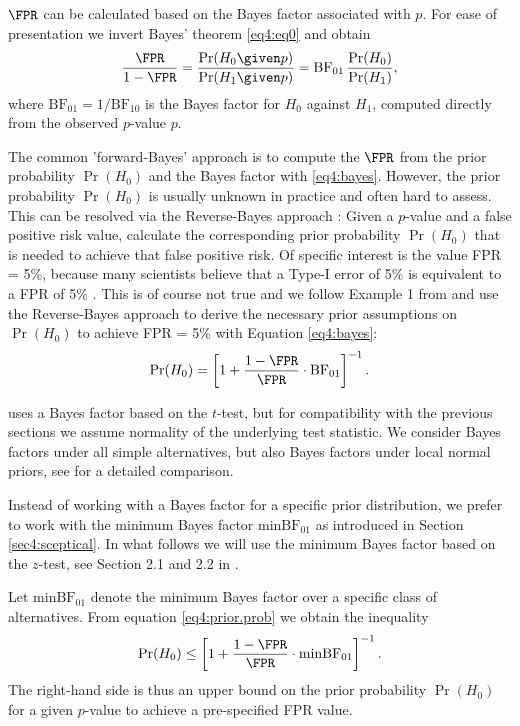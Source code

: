 $\FPR$ can be calculated based on the Bayes factor associated with $p$. For ease
of presentation we invert Bayes' theorem \eqref{eq4:eq0} and obtain
\begin{equation}\label{eq4:bayes}
      \frac{\FPR}{1-\FPR} = \frac{\Pr(H_0 \given p)}{\Pr(H_1 \given p)}
      = {\mbox{BF}_{01}} \, \frac{\Pr(H_0)}{\Pr(H_1)},
\end{equation}
where $\mbox{BF}_{01}=1/\mbox{BF}_{10}$ is the Bayes factor for $H_0$ against
$H_1$, computed directly from the observed $p$-value $p$.

The common 'forward-Bayes' approach is to compute the $\FPR$ from the prior
probability $\Pr(H_0)$ and the Bayes factor with \eqref{eq4:bayes}. However, the
prior probability $\Pr(H_0)$ is usually unknown in practice and often hard to
assess. This can be resolved via the Reverse-Bayes approach
\citep{Colquhoun2017,Colquhoun2019}: Given a $p$-value and a false positive risk
value, calculate the corresponding prior probability $\Pr(H_0)$ that is needed
to achieve that false positive risk. Of specific interest is the value FPR =
5\%, because many scientists believe that a Type-I error of 5\% is equivalent to
a FPR of 5\% \citep{Greenland2016}. This is of course not true and we follow
Example 1 from \citet{Berger1987} and use the Reverse-Bayes approach to derive
the necessary prior assumptions on $\Pr(H_0)$ to achieve FPR = 5\% with Equation
\eqref{eq4:bayes}:
\begin{equation}
  \label{eq4:prior.prob}
     \Pr(H_0) = \left[ 1 + \frac{1-\FPR}{\FPR} \cdot \mbox{BF}_{01}  \right]^{-1}.
\end{equation}

\citet{Colquhoun2017} uses a Bayes factor based on the $t$-test, but for
compatibility with the previous sections we assume normality of the underlying
test statistic. We consider Bayes factors under all simple alternatives, but
also Bayes factors under local normal priors, see \citet{Held2018} for a
detailed comparison.

Instead of working with a Bayes factor for a specific prior distribution, we
prefer to work with the minimum Bayes factor $\mbox{minBF}_{01}$ as introduced
in Section \ref{sec4:sceptical}. In what follows we will use the minimum Bayes
factor based on the $z$-test, see Section 2.1 and 2.2 in \citet{Held2018}.


Let $\mbox{minBF}_{01}$ denote the minimum Bayes factor over a specific class of
alternatives. From equation \eqref{eq4:prior.prob} we obtain the inequality
\begin{equation}\label{eq4:prior.prob2}
    \Pr(H_0) \leq \left[ 1 + \frac{1-\FPR}{\FPR} \cdot \mbox{minBF}_{01}  \right]^{-1}.
\end{equation}
The right-hand side is thus an upper bound on the prior probability $\Pr(H_0)$
for a given $p$-value to achieve a pre-specified FPR value.


